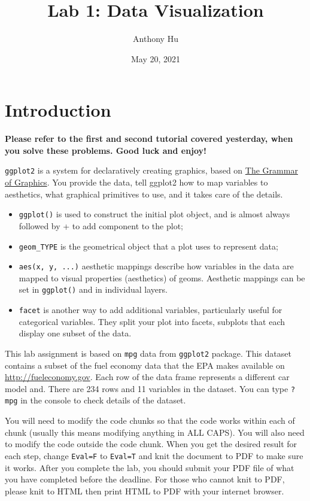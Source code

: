 \documentclass[]{article}
\title{Lab 1: Data Visualization}
\author{Anthony Hu}
\date{May 20, 2021}
\begin{document}
\maketitle

\hypertarget{introduction}{%
\section{Introduction}\label{introduction}}

\textbf{Please refer to the first and second tutorial covered yesterday,
when you solve these problems. Good luck and enjoy!}

\texttt{ggplot2} is a system for declaratively creating graphics, based
on \href{https://www.springer.com/it/book/9780387245447}{The Grammar of
Graphics}. You provide the data, tell ggplot2 how to map variables to
aesthetics, what graphical primitives to use, and it takes care of the
details.

\begin{itemize}
\item
  \texttt{ggplot()} is used to construct the initial plot object, and is
  almost always followed by + to add component to the plot;
\item
  \texttt{geom\_TYPE} is the geometrical object that a plot uses to
  represent data;
\item
  \texttt{aes(x,\ y,\ ...)} aesthetic mappings describe how variables in
  the data are mapped to visual properties (aesthetics) of geoms.
  Aesthetic mappings can be set in \texttt{ggplot()} and in individual
  layers.
\item
  \texttt{facet} is another way to add additional variables,
  particularly useful for categorical variables. They split your plot
  into facets, subplots that each display one subset of the data.
\end{itemize}

This lab assignment is based on \texttt{mpg} data from \texttt{ggplot2}
package. This dataset contains a subset of the fuel economy data that
the EPA makes available on \url{http://fueleconomy.gov}. Each row of the
data frame represents a different car model and. There are 234 rows and
11 variables in the dataset. You can type \texttt{?mpg} in the console
to check details of the dataset.

You will need to modify the code chunks so that the code works within
each of chunk (usually this means modifying anything in ALL CAPS). You
will also need to modify the code outside the code chunk. When you get
the desired result for each step, change \texttt{Eval=F} to
\texttt{Eval=T} and knit the document to PDF to make sure it works.
After you complete the lab, you should submit your PDF file of what you
have completed before the deadline. For those who cannot knit to PDF,
please knit to HTML then print HTML to PDF with your internet browser.
\end{document}
